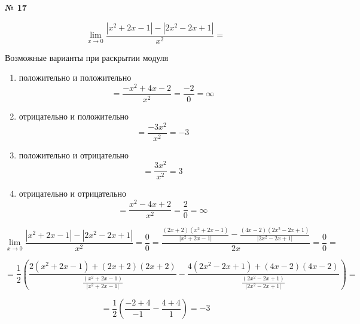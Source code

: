 \documentclass{article}
\begin{document}
\textbf{№ 17} 

\begingroup
\Large

$$ \lim\limits_{x \to 0} \frac{\left| x^2+2x-1 \right| - \left| 2x^2-2x+1 \right|}{x^2} 
= $$

Возможные варианты при раскрытии модуля
\begin{enumerate}
\item положительно и положительно
$$ = \frac{-x^2+4x-2}{x^2}
= \frac{-2}{0}
= \infty $$

\item отрицательно и положительно
$$ = \frac{-3x^2}{x^2}
= -3 $$

\item положительно и отрицательно
$$ = \frac{3x^2}{x^2}
= 3 $$

\item отрицательно и отрицательно
$$ = \frac{x^2-4x+2}{x^2}
= \frac{2}{0}
= \infty $$
\end{enumerate}

$$ \lim\limits_{x \to 0} \frac{\left| x^2+2x-1 \right| - \left| 2x^2-2x+1 \right|}{x^2} 
= \frac{0}{0}
= \frac{\frac{(2x+2)\left( x^2+2x-1 \right)}{\left| x^2+2x-1 \right|} - \frac{(4x-2)\left( 2x^2-2x+1 \right)}{\left| 2x^2-2x+1 \right|}}{2x} 
= \frac{0}{0}
= $$

$$ = \frac{1}{2} \left( \frac{2\left( x^2+2x-1 \right) + (2x+2)(2x+2)}{\frac{\left( x^2+2x-1 \right)}{\left| x^2+2x-1 \right|}} - \frac{4\left( 2x^2-2x+1 \right)+(4x-2)(4x-2)}{\frac{\left( 2x^2-2x+1 \right)}{\left| 2x^2-2x+1 \right|}} \right)
= $$

$$ = \frac{1}{2} \left( \frac{-2+4}{-1} - \frac{4+4}{1} \right)
= -3 $$

\endgroup
\end{document}

